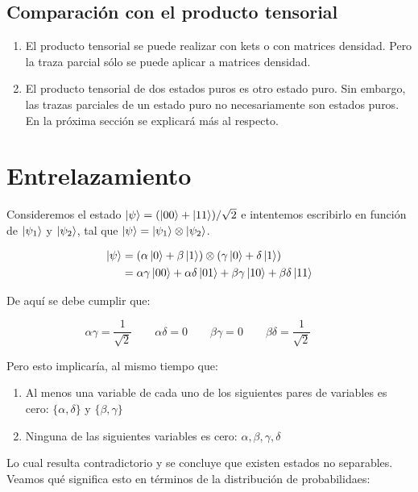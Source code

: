 \subsection{Comparación con el producto tensorial}

\begin{enumerate}
    \item El producto tensorial se puede realizar con kets o con matrices densidad. Pero la traza parcial sólo se puede aplicar a matrices densidad.
    \item El producto tensorial de dos estados puros es otro estado puro. Sin embargo, las trazas parciales de un estado puro no necesariamente son estados puros. En la próxima sección se explicará más al respecto.
\end{enumerate}

\section{Entrelazamiento}

Consideremos el estado $\ket{\psi} = (\ket{00} + \ket{11})/\sqrt{2}$ e intentemos escribirlo en función de $\ket{\psi_1}$ y $\ket{\psi_2}$, tal que $\ket{\psi} = \ket{\psi_1} \otimes \ket{\psi_2}$.

\begin{align*}
    \ket{\psi}
    &= (\alpha \ket{0} + \beta \ket{1}) \otimes (\gamma \ket{0} + \delta \ket{1}) \\
    &= \alpha \gamma \ket{00} + \alpha \delta \ket{01} + \beta \gamma \ket{10} + \beta \delta \ket{11}
\end{align*}

De aquí se debe cumplir que:

$$
    \alpha \gamma = \frac{1}{\sqrt{2}} \qquad
    \alpha \delta = 0 \qquad
    \beta \gamma = 0 \qquad
    \beta \delta = \frac{1}{\sqrt{2}} \qquad
$$

Pero esto implicaría, al mismo tiempo que:

\begin{enumerate}
    \item Al menos una variable de cada uno de los siguientes pares de variables es cero: $\{\alpha, \delta\}$ y $\{\beta, \gamma\}$
    \item Ninguna de las siguientes variables es cero: $\alpha, \beta, \gamma, \delta$
\end{enumerate}

Lo cual resulta contradictorio y se concluye que existen estados no separables. Veamos qué significa esto en términos de la distribución de probabilidaes:

